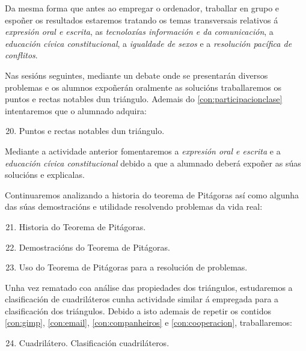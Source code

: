 Da mesma forma que antes ao empregar o ordenador, traballar en grupo e espoñer os resultados estaremos tratando os temas transversais relativos á \emph{expresión oral e escrita}, as \emph{tecnoloxías información e da comunicación}, a \emph{educación cívica constitucional}, a \emph{igualdade de sexos} e a \emph{resolución pacífica de conflitos}.

Nas sesións seguintes, mediante un debate onde se presentarán diversos problemas e os alumnos expoñerán oralmente as solucións traballaremos os puntos e rectas notables dun triángulo. Ademais do \ref{con:participacionclase} intentaremos que o alumnado adquira:

\begin{enumerate}[label=\bfseries Con\arabic*, align=left, leftmargin=1.5cm]
  \setcounter{enumi}{19}
  \item\label{con:puntosrectasnotables} Puntos e rectas notables dun triángulo.
\end{enumerate}

Mediante a actividade anterior fomentaremos a \emph{expresión oral e escrita} e a \emph{educación cívica constitucional} debido a que a alumnado deberá expoñer as súas solucións e explicalas.

Continuaremos analizando a historia do teorema de Pitágoras así como algunha das súas demostracións e utilidade resolvendo problemas da vida real:

\begin{enumerate}[label=\bfseries Con\arabic*, align=left, leftmargin=1.5cm]
  \setcounter{enumi}{20}
  \item\label{con:histpitag} Historia do Teorema de Pitágoras.
  \item\label{con:dempitag} Demostracións do Teorema de Pitágoras.
  \item\label{con:problepitag} Uso do Teorema de Pitágoras para a resolución de problemas.
\end{enumerate}

Unha vez rematado coa análise das propiedades dos triángulos, estudaremos a clasificación de cuadriláteros cunha actividade similar á empregada para a clasificación dos triángulos. Debido a isto ademais de repetir os contidos \ref{con:gimp}, \ref{con:email}, \ref{con:companheiros} e \ref{con:cooperacion}, traballaremos:

\begin{enumerate}[label=\bfseries Con\arabic*, align=left, leftmargin=1.5cm]
  \setcounter{enumi}{23}
  \item\label{con:cuadrilateros} Cuadrilátero. Clasificación cuadriláteros.
\end{enumerate}

